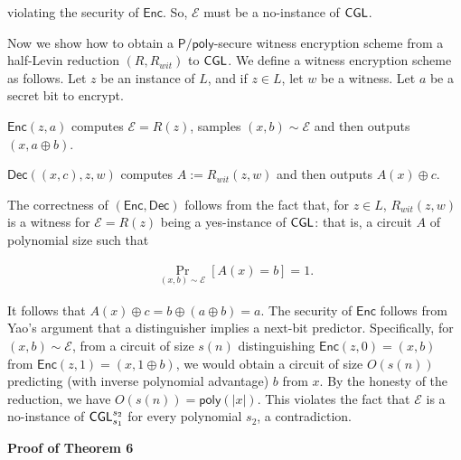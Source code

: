 \documentclass[10pt,a4paper]{article}
\begin{document}
violating the security of ${\mathsf{Enc}}$. So, $\mathcal{E}$ must be a no-instance of ${\sf CGL}$.\par




Now we show how to obtain a ${\mathsf{P}}/{\mathsf{poly}}$-secure witness encryption scheme from a half-Levin reduction $(R,R_{wit})$ to ${\sf CGL}$. We define a witness encryption scheme as follows. Let $z$ be an instance of $L$, and if $z\in L$, let $w$ be a witness. Let $a$ be a secret bit to encrypt.\par



${\mathsf{Enc}}(z,a)$ computes $\mathcal{E}=R(z)$, samples $(x,b)\sim\mathcal{E}$ and then outputs $(x,a\oplus b)$.\par




${\mathsf{Dec}}((x,c),z,w)$ computes $A:=R_{wit}(z,w)$ and then outputs $A(x)\oplus c$.\par



The correctness of $({\mathsf{Enc}},{\mathsf{Dec}})$ follows from the fact that, for $z\in L$, $R_{wit}(z,w)$ is a witness for $\mathcal{E}=R(z)$ being a yes-instance of ${\sf CGL}$: that is, a circuit $A$ of polynomial size such that\par


\[\begin{gathered}
\Pr_{(x,b)\sim\mathcal{E}}[A(x)=b]=1.
\end{gathered}\]


It follows that $A(x)\oplus c=b\oplus(a\oplus b)=a$. The security of ${\mathsf{Enc}}$ follows from Yao’s argument that a distinguisher implies a next-bit predictor. Specifically, for $(x,b)\sim\mathcal{E}$, from a circuit of size $s(n)$ distinguishing ${\mathsf{Enc}}(z,0)=(x,b)$ from ${\mathsf{Enc}}(z,1)=(x,1\oplus b)$, we would obtain a circuit of size $O(s(n))$ predicting (with inverse polynomial advantage) $b$ from $x$. By the honesty of the reduction, we have $O(s(n))={\mathsf{poly}}(|x|)$. This violates the fact that $\mathcal{E}$ is a no-instance of ${\sf CGL}_{s_{1}}^{s_{2}}$ for every polynomial $s_{2}$, a contradiction.\par





\par\medskip\noindent\textbf{Proof of Theorem 6
}\par
\end{document}
